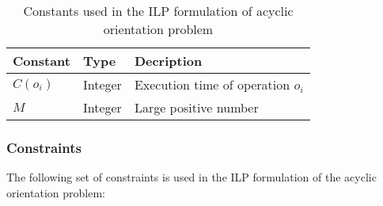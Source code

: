 \begin{table}[!htbp]
\caption{Constants used in the ILP formulation of acyclic orientation problem}
\centering
\label{table:consilporient}
\begin{tabular}{l l l}
\toprule
Constant & Type & Decription\\
\midrule
 $C(o_i)$ & Integer & Execution time of operation $o_i$\\
 $M$ & Integer & Large positive number\\
\bottomrule
\end{tabular}
\end{table}

\subsubsection{Constraints}

The following set of constraints is used in the ILP formulation of the acyclic orientation problem:

